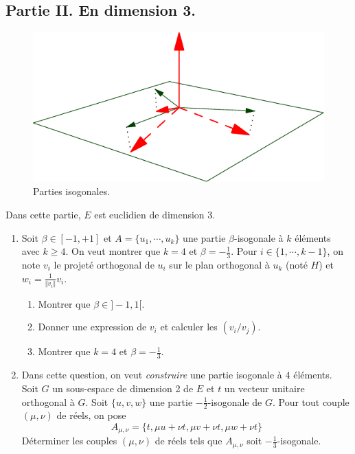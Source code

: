 \subsection*{Partie II. En dimension 3.}
\begin{figure}[ht!]
 \centering
 \includegraphics{./Eisogo_1.pdf}
 \caption{Parties isogonales.}
 \label{fig:Eisogo_1}
\end{figure}

Dans cette partie, $E$ est euclidien de dimension $3$.
\begin{enumerate}
\item Soit $\beta\in [-1,+1]$ et $A=\{u_1,\cdots, u_k\}$ une partie $\beta$-isogonale à $k$ éléments avec $k\geq 4$. On veut montrer que $k=4$ et $\beta=-\frac{1}{3}$.\newline
Pour $i\in\{1,\cdots,k-1\}$, on note $v_i$ le projeté orthogonal de $u_i$ sur le plan orthogonal à $u_k$ (noté $H$) et $w_i=\frac{1}{\Vert v_i\Vert}v_i$.
\begin{enumerate}
\item Montrer que $\beta \in ]-1,1[$.
\item Donner une expression de $v_i$ et calculer les $(v_i/v_j)$.
\item Montrer que $k=4$ et $\beta=-\frac{1}{3}$.
\end{enumerate}
\item Dans cette question, on veut \emph{construire} une partie isogonale à $4$ éléments.\newline
Soit $G$ un sous-espace de dimension 2 de $E$ et $t$ un vecteur unitaire orthogonal {\`a} $G$. Soit $\{u,v,w\}$ une partie $-\frac{1}{2}$-isogonale de $G$. Pour tout couple $(\mu,\nu)$ de r{\'e}els, on pose
\begin{displaymath}
A_{\mu,\nu}=\{t,\mu u+\nu t,\mu v+\nu t,\mu w+\nu t\} 
\end{displaymath}
D{\'e}terminer les couples $(\mu,\nu)$ de r{\'e}els tels que $A_{\mu,\nu}$ soit $-\frac{1}{3}$-isogonale.
\end{enumerate}
